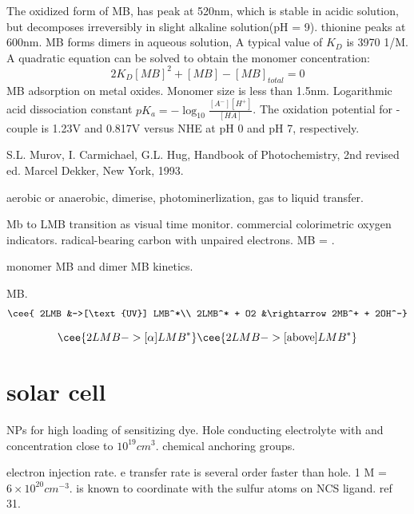 The oxidized form of MB,  has peak at 520nm, which is stable in acidic solution, but decomposes irreversibly in slight alkaline solution(pH = 9).
thionine peaks at 600nm.
MB forms dimers in aqueous solution,
A typical value of $K_D$ is 3970 1/M. A quadratic equation can be solved to obtain the monomer concentration:
\[
2K_D [MB]^2 + [MB] - [MB]_{total} = 0
\]
MB adsorption on metal oxides. Monomer size is less than 1.5nm.
Logarithmic acid dissociation constant $pK_a= -\log_10 \frac{[A^-][H^+]}{[HA]}$. The oxidation potential for - couple is 1.23V and 0.817V versus NHE at pH 0 and pH 7, respectively.



S.L. Murov, I. Carmichael, G.L. Hug, Handbook of Photochemistry, 2nd revised ed. Marcel Dekker, New York, 1993.

aerobic or anaerobic, dimerise, photominerlization, gas to liquid transfer.

Mb to LMB transition as visual time monitor. commercial colorimetric oxygen indicators. radical-bearing carbon with unpaired electrons. MB = .\cite{Galagan2008}

monomer MB and dimer MB kinetics.\cite{Spencer1979}



MB. \cite{Lee2003a}
\begin{align}
\cee{ 2LMB &->[\text{UV}] LMB^*\\
2LMB^* + O2 &\rightarrow 2MB^+ + 2OH^-}
\end{align}

\[
\cee{2LMB ->[\alpha] LMB^*}
\cee{2LMB ->[\text{above}] LMB^*}
\]


\section{solar cell}


 NPs for high loading of sensitizing dye. Hole conducting electrolyte with  and  concentration close to $10^19 cm^3$. chemical anchoring groups.

electron injection rate. e transfer rate is several order faster than hole. 1 M = $6\times10^{20} cm^{-3}$.  is known to coordinate with the sulfur atoms on NCS ligand. ref 31.


